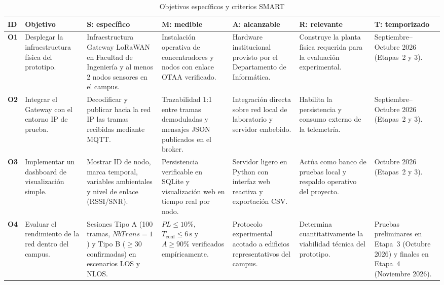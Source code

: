 \documentclass[12pt,oneside,openany,spanish,oldfontcommands]{memoir}
\renewcommand{\arraystretch}{1.15}
\begin{document}
\begin{table}[!htbp]
\centering
\caption{Objetivos específicos y criterios SMART}
\label{tab:smart}
\tiny
\setlength{\tabcolsep}{2pt}
\renewcommand{\arraystretch}{1.2}
\begin{tabularx}{\textwidth}{
    >{\bfseries\centering\arraybackslash}p{0.45cm}
    >{\raggedright\arraybackslash}p{1.7cm}
    >{\raggedright\arraybackslash\hsize=1.05\hsize}X
    >{\raggedright\arraybackslash\hsize=1.05\hsize}X
    >{\raggedright\arraybackslash\hsize=0.95\hsize}X
    >{\raggedright\arraybackslash\hsize=0.95\hsize}X
    >{\raggedright\arraybackslash\hsize=1.00\hsize}X}
\toprule
\textbf{ID} &
\textbf{Objetivo} &
\textbf{S: específico} &
\textbf{M: medible} &
\textbf{A: alcanzable} &
\textbf{R: relevante} &
\textbf{T: temporizado}\\
\midrule
O1 &
Desplegar la infraestructura física del prototipo. &
Infraestructura Gateway LoRaWAN en Facultad de Ingeniería y al menos 2 nodos sensores en el campus. &
Instalación operativa de concentradores y nodos con enlace OTAA verificado. &
Hardware institucional provisto por el Departamento de Informática. &
Construye la planta física requerida para la evaluación experimental. &
Septiembre--Octubre 2026 (Etapas~2 y 3).\\
\midrule
O2 &
Integrar el Gateway con el entorno IP de prueba. &
Decodificar y publicar hacia la red IP las tramas recibidas mediante MQTT. &
Trazabilidad 1:1 entre tramas demoduladas y mensajes JSON publicados en el broker. &
Integración directa sobre red local de laboratorio y servidor embebido. &
Habilita la persistencia y consumo externo de la telemetría. &
Septiembre--Octubre 2026 (Etapas~2 y 3).\\
\midrule
O3 &
Implementar un dashboard de visualización simple. &
Mostrar ID de nodo, marca temporal, variables ambientales y nivel de enlace (RSSI/SNR). &
Persistencia verificable en SQLite y visualización web en tiempo real por nodo. &
Servidor ligero en Python con interfaz web reactiva y exportación CSV. &
Actúa como banco de pruebas local y respaldo operativo del proyecto. &
Octubre 2026 (Etapas~2 y 3).\\
\midrule
O4 &
Evaluar el rendimiento de la red dentro del campus. &
Sesiones Tipo A (100 tramas, $NbTrans=1$) y Tipo B ($\geq 30$ confirmadas) en escenarios LOS y NLOS. &
$PL \leq 10\%$, $T_{\mathrm{conf}} \leq 6\,\text{s}$ y $A \geq 90\%$ verificados empíricamente. &
Protocolo experimental acotado a edificios representativos del campus. &
Determina cuantitativamente la viabilidad técnica del prototipo. &
Pruebas preliminares en Etapa~3 (Octubre 2026) y finales en Etapa~4 (Noviembre 2026).\\
\bottomrule
\end{tabularx}
\end{table}
\end{document}
